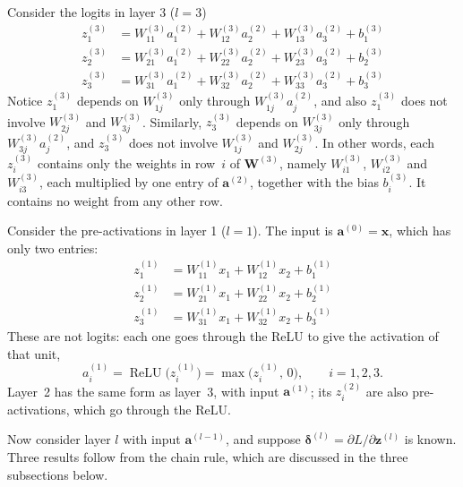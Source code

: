 \documentclass[12pt]{article}
\numberwithin{equation}{section} %
\newcommand{\relu}{\operatorname{ReLU}}
\newcommand{\vc}[1]{\symbf{#1}}
\begin{document}
Consider the logits in layer 3 ($l = 3$)
\begin{align*}
    z^{(3)}_{1} &= W^{(3)}_{11}a^{(2)}_1 + W^{(3)}_{12}a^{(2)}_2 + W^{(3)}_{13}a^{(2)}_3 + b^{(3)}_1 \\[3pt]
    z^{(3)}_{2} &= W^{(3)}_{21}a^{(2)}_1 + W^{(3)}_{22}a^{(2)}_2 + W^{(3)}_{23}a^{(2)}_3 + b^{(3)}_2 \\[3pt]
    z^{(3)}_{3} &= W^{(3)}_{31}a^{(2)}_1 + W^{(3)}_{32}a^{(2)}_2 + W^{(3)}_{33}a^{(2)}_3 + b^{(3)}_3
\end{align*}
Notice $z^{(3)}_{1}$ depends on
$W^{(3)}_{1j}$ only through $W^{(3)}_{1j}a^{(2)}_j$,
and also $z^{(3)}_{1}$ does not involve
$W^{(3)}_{2j}$ and $W^{(3)}_{3j}$.
Similarly, $z^{(3)}_{3}$ depends on
$W^{(3)}_{3j}$ only through $W^{(3)}_{3j}a^{(2)}_j$,
and $z^{(3)}_{3}$ does not involve
$W^{(3)}_{1j}$ and $W^{(3)}_{2j}$. In other words,
each $z^{(3)}_i$ contains only the weights in
row~$i$ of $\vc{W}^{(3)}$, namely
$W^{(3)}_{i1}$, $W^{(3)}_{i2}$ and $W^{(3)}_{i3}$,
each multiplied by one entry of
$\vc{a}^{(2)}$, together with the bias
$b^{(3)}_i$. It contains no weight from
any other row.

Consider the pre-activations in layer 1 ($l = 1$). The input is
$\vc{a}^{(0)}=\vc{x}$, which has only two entries:
\begin{align*}
    z^{(1)}_{1} &= W^{(1)}_{11}x_1 + W^{(1)}_{12}x_2 + b^{(1)}_1 \\[3pt]
    z^{(1)}_{2} &= W^{(1)}_{21}x_1 + W^{(1)}_{22}x_2 + b^{(1)}_2 \\[3pt]
    z^{(1)}_{3} &= W^{(1)}_{31}x_1 + W^{(1)}_{32}x_2 + b^{(1)}_3
\end{align*}
These are not logits: each one goes through the ReLU to give the activation
of that unit,
\[
    a^{(1)}_i=\relu\bigl(z^{(1)}_i\bigr)=\max\bigl(z^{(1)}_i,\,0\bigr),
    \qquad i=1,2,3 .
\]
Layer~2 has the same form as layer~3, with input $\vc{a}^{(1)}$; its
$z^{(2)}_i$ are also pre-activations, which go through the ReLU.

Now consider layer $l$ with
input $\vc{a}^{(l-1)}$, and suppose
$\vc{\delta}^{(l)}=\partial L/\partial\vc{z}^{(l)}$
is known. Three results follow from the chain rule,
which are discussed in the three subsections below.
\end{document}

